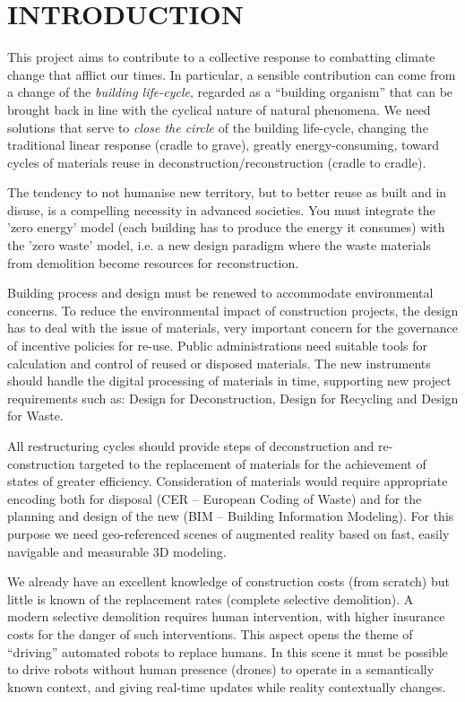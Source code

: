 \section{\uppercase{Introduction}}
\label{sec:introduction}

This project aims to contribute to a collective response to combatting climate change that afflict our times. In particular, a sensible contribution can come from a change of the \emph{building life-cycle}, regarded as a ``building organism'' that can be brought back in line with the cyclical nature of natural phenomena. We need solutions that serve to \emph{close the circle} of the building life-cycle, changing the traditional linear response (cradle to grave), greatly energy-consuming, toward cycles of materials reuse in deconstruction/reconstruction (cradle to cradle).
 
The tendency to not humanise new territory, but to better reuse as built and in disuse, is a compelling necessity in advanced societies. You must integrate the 'zero energy' model (each building has to produce the energy it consumes) with the 'zero waste' model, i.e. a new design paradigm where the waste materials from demolition become resources for reconstruction. 

Building process and design must be renewed to accommodate environmental concerns. To reduce the environmental impact of construction projects, the design has to deal with the issue of materials, very  important concern for the governance of incentive policies for re-use. Public administrations need suitable tools for calculation and control of reused or disposed materials. The new instruments should handle the digital processing of materials in time, supporting new project requirements such as: Design for Deconstruction, Design for Recycling and Design for Waste.

All restructuring cycles should provide steps of deconstruction and re-construction targeted to the replacement of materials for the achievement of states of greater efficiency.
Consideration of materials would require appropriate encoding both for disposal (CER -- European Coding of Waste) and for the planning and design of the new (BIM -- Building Information Modeling). For this purpose we need geo-referenced scenes of augmented reality based on  fast, easily navigable and measurable 3D modeling. 

We already have an excellent knowledge of construction costs (from scratch) but little is known of the replacement rates (complete selective demolition). A modern selective demolition requires human intervention, with higher insurance costs for the danger of such interventions. This aspect opens the theme of ``driving'' automated robots to replace humans.  In this scene it must be possible to drive robots without human presence (drones) to  operate in a semantically known context, and giving real-time updates while reality contextually changes.

